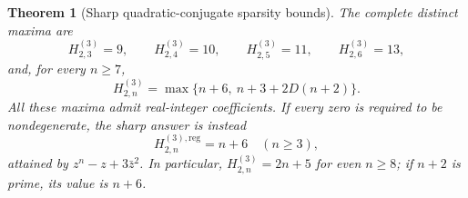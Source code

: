 \documentclass[UTF8,11pt]{ctexart}
\newtheorem{thm}{Theorem}[section]
\theoremstyle{definition}
\numberwithin{equation}{section}
\begin{document}
\begin{thm}[Sharp quadratic-conjugate sparsity bounds]
\label{v13:thm:sparsemaximum}
The complete distinct maxima are
\begin{equation}\label{v13:eq:lowdegrees}
 H^{(3)}_{2,3}=9,\qquad H^{(3)}_{2,4}=10,\qquad
 H^{(3)}_{2,5}=11,\qquad H^{(3)}_{2,6}=13,
\end{equation}
and, for every $n\ge7$,
\begin{equation}\label{v13:eq:sparsemaximum}
 \boxed{\displaystyle
 H^{(3)}_{2,n}=\max\{n+6,\ n+3+2D(n+2)\}.}
\end{equation}
All these maxima admit real-integer coefficients. If every
zero is required to be nondegenerate, the sharp answer is instead
\begin{equation}\label{v13:eq:regularmaximum}
 \boxed{H^{(3),\mathrm{reg}}_{2,n}=n+6\quad(n\ge3),}
\end{equation}
attained by $z^n-z+3\bar z^2$.
In particular, $H^{(3)}_{2,n}=2n+5$ for even $n\ge8$;
if $n+2$ is prime, its value is $n+6$.
\end{thm}
\end{document}
